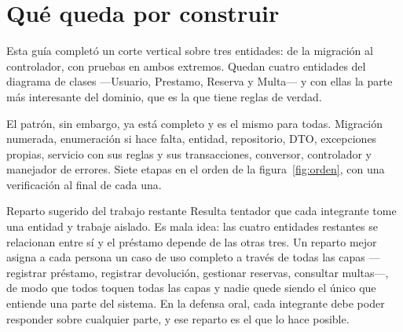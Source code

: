 \documentclass[11pt,a4paper,openany]{book}
\begin{document}
\section*{Qué queda por construir}

Esta guía completó un corte vertical sobre tres entidades: de la migración al controlador, con pruebas en ambos extremos. Quedan cuatro entidades del diagrama de clases ---Usuario, Prestamo, Reserva y Multa--- y con ellas la parte más interesante del dominio, que es la que tiene reglas de verdad.

El patrón, sin embargo, ya está completo y es el mismo para todas. Migración numerada, enumeración si hace falta, entidad, repositorio, DTO, excepciones propias, servicio con sus reglas y sus transacciones, conversor, controlador y manejador de errores. Siete etapas en el orden de la figura~\ref{fig:orden}, con una verificación al final de cada una.

\begin{cajabuenas}{Reparto sugerido del trabajo restante}
	Resulta tentador que cada integrante tome una entidad y trabaje aislado. Es mala idea: las cuatro entidades restantes se relacionan entre sí y el préstamo depende de las otras tres. Un reparto mejor asigna a cada persona un caso de uso completo a través de todas las capas ---registrar préstamo, registrar devolución, gestionar reservas, consultar multas---, de modo que todos toquen todas las capas y nadie quede siendo el único que entiende una parte del sistema. En la defensa oral, cada integrante debe poder responder sobre cualquier parte, y ese reparto es el que lo hace posible.
\end{cajabuenas}



\end{document}
